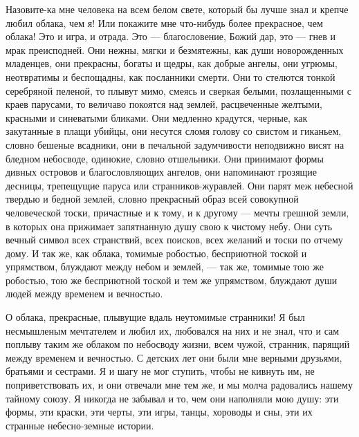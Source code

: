 Назовите-ка мне человека на всем белом  свете, который бы лучше знал и
крепче  любил  облака,  чем  я!  Или  покажите  мне  что-нибудь  более
прекрасное, чем облака!  Это и игра, и отрада.  Это --- благословение,
Божий  дар, это  ---  гнев  и мрак  преисподней.  Они  нежны, мягки  и
безмятежны, как души новорожденных  младенцев, они прекрасны, богаты и
щедры, как  добрые ангелы, они  угрюмы, неотвратимы и  беспощадны, как
посланники  смерти.  Они то  стелются  тонкой  серебряной пеленой,  то
плывут мимо, смеясь  и сверкая белыми, позлащенными  с краев парусами,
то  величаво покоятся  над  землей, расцвеченные  желтыми, красными  и
синеватыми бликами.  Они медленно  крадутся, черные, как  закутанные в
плащи убийцы, они  несутся сломя голову со свистом  и гиканьем, словно
бешеные  всадники, они  в печальной  задумчивости неподвижно  висят на
бледном небосводе,  одинокие, словно  отшельники. Они  принимают формы
дивных  островов и  благословляющих ангелов,  они напоминают  грозящие
десницы,  трепещущие паруса  или  странников-журавлей.  Они парят  меж
небесной  твердью  и  бедной  землей,  словно  прекрасный  образ  всей
совокупной человеческой  тоски, причастные и  к тому, и к  другому ---
мечты грешной земли,  в которых она прижимает запятнанную  душу свою к
чистому небу.  Они суть вечный  символ всех странствий,  всех поисков,
всех желаний  и тоски по  отчему дому. И  так же, как  облака, томимые
робостью,  бесприютной тоской  и  упрямством, блуждают  между небом  и
землей, --- так же, томимые тою же робостью, тою же бесприютной тоской
и тем же упрямством, блуждают души людей между временем и вечностью.

О  облака,  прекрасные, плывущие  вдаль  неутомимые  странники! Я  был
несмышленым мечтателем и  любил их, любовался на них и  не знал, что и
сам поплыву таким же облаком по небосводу жизни, всем чужой, странник,
парящий между временем и вечностью. С детских лет они были мне верными
друзьями,  братьями и  сестрами. Я  и шагу  не мог  ступить, чтобы  не
кивнуть им,  не поприветствовать их, и  они отвечали мне тем  же, и мы
молча радовались нашему тайному союзу. Я  никогда не забывал и то, чем
они наполняли  мою душу: эти формы,  эти краски, эти черты,  эти игры,
танцы, хороводы и сны, эти их странные небесно-земные истории.

